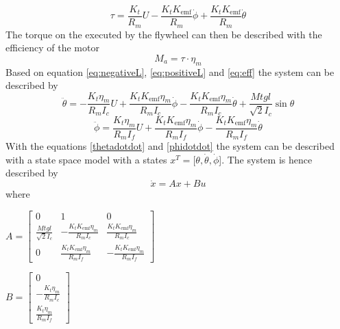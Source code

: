 \documentclass[a4paper,11pt]{kth-mag}
\begin{document}
\begin{equation} \label{eq:tau}
\tau = \frac{K_t}{R_m} U - \frac{K_t K_{\text{emf}} }{R_m} \dot{\phi} + \frac{K_t K_{\text{emf}} }{R_m} \dot{\theta}
\end{equation}
The torque on the executed by the flywheel can then be described with the efficiency of the motor
\begin{equation} \label{eq:eff}
M_a = \tau \cdot \eta_m
\end{equation}
Based on equation \eqref{eq:negativeL}, \eqref{eq:positiveL} and \eqref{eq:eff} the system can be described by
\begin{equation}
\ddot{\theta} = -\frac{K_t \eta_m}{R_m I_c} U + \frac{K_t K_{\text{emf}} \eta_m}{R_m I_c} \dot{\phi} - \frac{K_t K_{\text{emf}} \eta_m}{R_m I_c} \dot{\theta} + \frac{Mt g l }{\sqrt{2} I_c} \sin \theta \label{thetadotdot}
\end{equation}
\begin{equation}
\ddot{\phi} = \frac{K_t \eta_m}{R_m I_f} U + \frac{K_t K_{\text{emf}} \eta_m}{R_m I_f} \dot{\phi} - \frac{K_t K_{\text{emf}} \eta_m}{R_m I_f} \dot{\theta} 
\label{phidotdot}
\end{equation} 
With the equations \eqref{thetadotdot} and \eqref{phidotdot} the system can be described with a state space model with a states $x^T = [\theta, \dot{\theta}, \dot{\phi}$]. The system is hence described by
\begin{equation}
\dot{x} = Ax + Bu
\end{equation} 
where \\
\begin{center}
$A =\begin{bmatrix}
0 & 1 & 0 \\
\frac{Mt g l }{\sqrt{2} I_c} & - \frac{K_t K_{\text{emf}} \eta_m}{R_m I_c} & \frac{K_t K_{\text{emf}} \eta_m}{R_m I_c} \\ 
0 & \frac{K_t K_{\text{emf}} \eta_m}{R_m I_f} & -\frac{K_t K_{\text{emf}} \eta_m}{R_m I_f}
\end{bmatrix}$

$B = \begin{bmatrix}
0 \\ 
-\frac{K_t \eta_m}{R_m I_c} \\
\frac{K_t \eta_m}{R_m I_f}
\end{bmatrix} $
\end{center}
\end{document}
